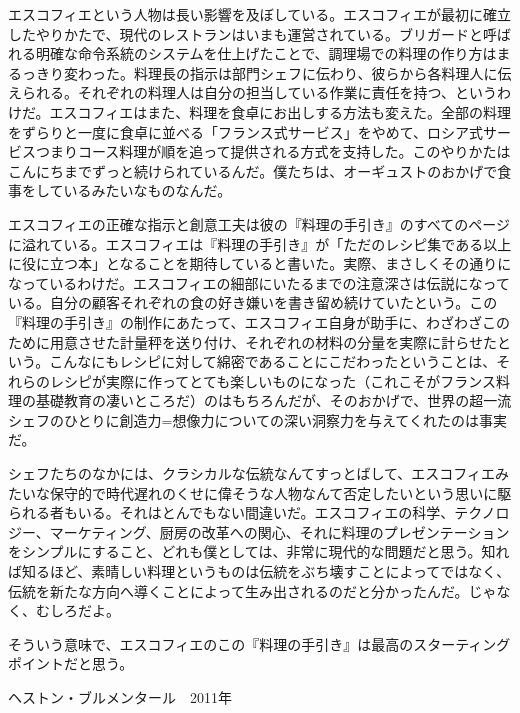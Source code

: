\begin{main}
エスコフィエという人物は長い影響を及ぼしている。エスコフィエが最初に確立したやりかたで、現代のレストランはいまも運営されている。ブリガードと呼ばれる明確な命令系統のシステムを仕上げたことで、調理場での料理の作り方はまるっきり変わった。料理長の指示は部門シェフに伝わり、彼らから各料理人に伝えられる。それぞれの料理人は自分の担当している作業に責任を持つ、というわけだ。エスコフィエはまた、料理を食卓にお出しする方法も変えた。全部の料理をずらりと一度に食卓に並べる「フランス式サービス」をやめて、ロシア式サービスつまりコース料理が順を追って提供される方式を支持した。このやりかたはこんにちまでずっと続けられているんだ。僕たちは、オーギュストのおかげで食事をしているみたいなものなんだ。

エスコフィエの正確な指示と創意工夫は彼の『料理の手引き』のすべてのページに溢れている。エスコフィエは『料理の手引き』が「ただのレシピ集である以上に役に立つ本」となることを期待していると書いた。実際、まさしくその通りになっているわけだ。エスコフィエの細部にいたるまでの注意深さは伝説になっている。自分の顧客それぞれの食の好き嫌いを書き留め続けていたという。この『料理の手引き』の制作にあたって、エスコフィエ自身が助手に、わざわざこのために用意させた計量秤を送り付け、それぞれの材料の分量を実際に計らせたという。こんなにもレシピに対して綿密であることにこだわったということは、それらのレシピが実際に作ってとても楽しいものになった（これこそがフランス料理の基礎教育の凄いところだ）のはもちろんだが、そのおかげで、世界の超一流シェフのひとりに創造力=想像力についての深い洞察力を与えてくれたのは事実だ。

シェフたちのなかには、クラシカルな伝統なんてすっとばして、エスコフィエみたいな保守的で時代遅れのくせに偉そうな人物なんて否定したいという思いに駆られる者もいる。それはとんでもない間違いだ。エスコフィエの科学、テクノロジー、マーケティング、厨房の改革への関心、それに料理のプレゼンテーションをシンプルにすること、どれも僕としては、非常に現代的な問題だと思う。知れば知るほど、素晴しい料理というものは伝統をぶち壊すことによってではなく、伝統を新たな方向へ導くことによって生み出されるのだと分かったんだ。じゃなく、むしろだよ。

\thispagestyle{empty}

そういう意味で、エスコフィエのこの『料理の手引き』は最高のスターティングポイントだと思う。

\vspace{1\zw}
\begin{flushright}
ヘストン・ブルメンタール　2011年
\end{flushright}

\end{main}
